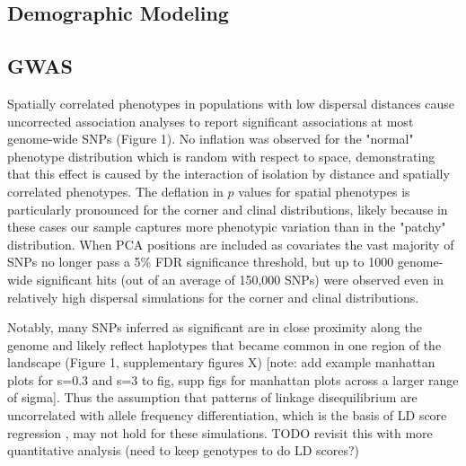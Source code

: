 \documentclass[9pt,twocolumn,twoside,lineno]{gsajnl}
\begin{document}
\subsection{Demographic Modeling}



\subsection{GWAS}
Spatially correlated phenotypes in populations with low dispersal distances cause uncorrected association analyses to report significant associations at most genome-wide SNPs (Figure 1). No inflation was observed for the "normal" phenotype distribution which is random with respect to space, demonstrating that this effect is caused by the interaction of isolation by distance and spatially correlated phenotypes. The deflation in $p$ values for spatial phenotypes is particularly pronounced for the corner and clinal distributions, likely because in these cases our sample captures more phenotypic variation than in the "patchy" distribution. When PCA positions are included as covariates the vast majority of SNPs no longer pass a 5\% FDR significance threshold, but up to 1000 genome-wide significant hits (out of an average of 150,000 SNPs) were observed even in relatively high dispersal simulations for the corner and clinal distributions. 

Notably, many SNPs inferred as significant are in close proximity along the genome and likely reflect haplotypes that became common in one region of the landscape (Figure 1, supplementary figures X) [note: add example manhattan plots for s=0.3 and s=3 to fig, supp figs for manhattan plots across a larger range of sigma]. Thus the assumption that patterns of linkage disequilibrium are uncorrelated with allele frequency differentiation, which is the basis of LD score regression \citep{Bulik-Sullivan2015}, may not hold for these simulations. TODO revisit this with more quantitative analysis (need to keep genotypes to do LD scores?) 
\end{document}
